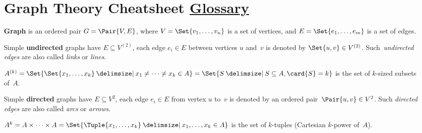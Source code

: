 \documentclass[a4paper,10pt]{article}
\begin{document}

\setcounter{section}{4}
\section{Graph Theory Cheatsheet%
\texorpdfstring{\normalsize\hfill\href{https://en.wikipedia.org/wiki/Glossary_of_graph_theory}{Glossary}}{}}

\begin{terms}
    \item \textbf{Graph} is an ordered pair $G = \Pair{V, E}$, where $V = \Set{v_1,\dotsc,v_n}$ is a set of vertices, and $E = \Set{e_1,\dotsc,e_m}$ is a set of edges.

    \item Simple \textbf{undirected} graphs have $E \subseteq V^{(2)}$, \ie each edge $e_i \in E$ between vertices $u$ and~$v$ is denoted by $\Set{u,v} \in V^{(2)}$.
    Such~\emph{undirected edges} are also called \emph{links} or \emph{lines}.

    \begin{terms}
        \item $A^{(k)} = \Set{\Set{x_1,\dotsc,x_k} \given x_1 \neq \dotsb \neq x_k \in A} = \Set{ S \given S \subseteq A, \card{S} = k }$ is the set of $k$-sized subsets of~$A$.
    \end{terms}

    \item Simple \textbf{directed} graphs have $E \subseteq V^{2}$, \ie each edge $e_i \in E$ from vertex $u$ to~$v$ is denoted by an ordered pair~$\Pair{u,v} \in V^{2}$.
    Such \emph{directed edges} are also called \emph{arcs} or \emph{arrows}.

    \begin{terms}
        \item $A^k = A \times \dotsb \times A = \Set{\Tuple{x_1,\dotsc,x_k} \given x_1,\dotsc,x_k \in A}$ is the set of $k$-tuples (Cartesian $k$-power of~$A$).
    \end{terms}

    \begin{minipage}{\linewidth}


\end{minipage}
\end{terms}
\end{document}
